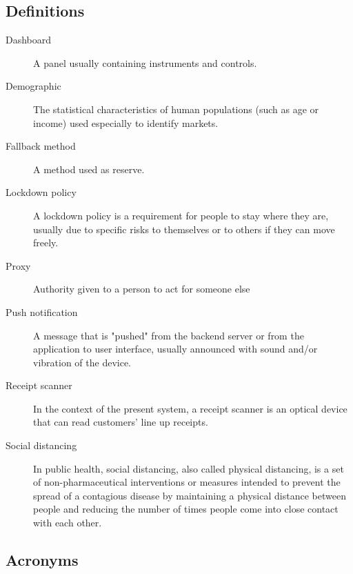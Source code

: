 \documentclass[../../main.tex]{subfiles}
\begin{document}
\subsection{Definitions}

\begin{description}
    
    \item[Dashboard] A panel usually containing instruments and controls.
    
    \item[Demographic] The statistical characteristics of human populations (such as age or income) used especially to identify markets.
    
    \item[Fallback method] A method used as reserve.

    \item[Lockdown policy] A lockdown policy is a requirement for people to stay where they are, usually due to specific risks to themselves or to others if they can move freely. 
    
    \item[Proxy] Authority given to a person to act for someone else

    \item[Push notification] A message that is "pushed" from the backend server or from the application to user interface, usually announced with sound and/or vibration of the device.

    \item[Receipt scanner] In the context of the present system, a receipt scanner is an optical device that can read customers' line up receipts.

    \item[Social distancing] In public health, social distancing, also called physical distancing,
                             is a set of non-pharmaceutical interventions or measures intended to prevent the spread of a contagious disease by maintaining 
                             a physical distance between people and reducing the number of times people come into close contact with each other.
\end{description}

\subsection{Acronyms}
\end{document}
